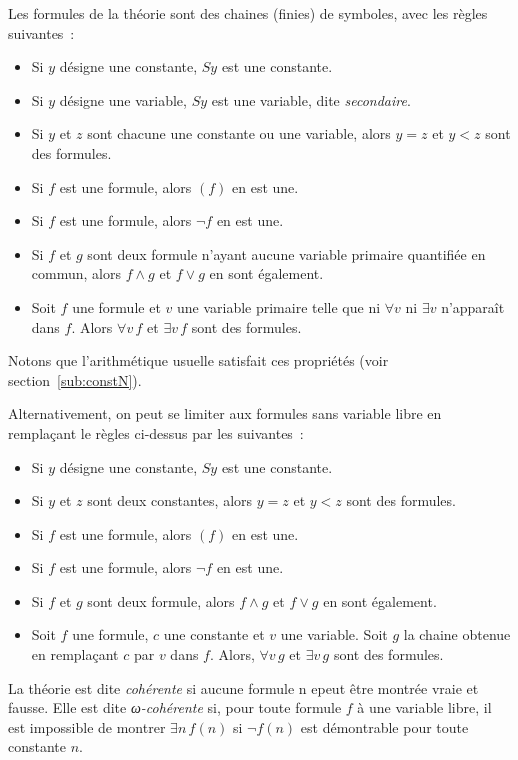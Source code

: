 Les formules de la théorie sont des chaines (finies) de symboles, avec les règles suivantes : 
\begin{itemize}[nosep]
    \item Si $y$ désigne une constante, $S y$ est une constante.
    \item Si $y$ désigne une variable, $S y$ est une variable, dite \emph{secondaire}.
    \item Si $y$ et $z$ sont chacune une constante ou une variable, alors $y = z$ et $y < z$ sont des formules.
    \item Si $f$ est une formule, alors $(f)$ en est une. 
    \item Si $f$ est une formule, alors $\neg f$ en est une. 
    \item Si $f$ et $g$ sont deux formule n'ayant aucune variable primaire quantifiée en commun, alors $f \wedge g$ et $f \vee g$ en sont également. 
    \item Soit $f$ une formule et $v$ une variable primaire telle que ni $\forall v$ ni $\exists v$ n'apparaît dans $f$. 
        Alors $\forall v \, f$ et $\exists v \, f$ sont des formules.
\end{itemize}
Notons que l'arithmétique usuelle satisfait ces propriétés (voir section~\ref{sub:constN}).

Alternativement, on peut se limiter aux formules sans variable libre en remplaçant le règles ci-dessus par les suivantes :
\begin{itemize}[nosep]
    \item Si $y$ désigne une constante, $S y$ est une constante.
    \item Si $y$ et $z$ sont deux constantes, alors $y = z$ et $y < z$ sont des formules.
    \item Si $f$ est une formule, alors $(f)$ en est une. 
    \item Si $f$ est une formule, alors $\neg f$ en est une. 
    \item Si $f$ et $g$ sont deux formule, alors $f \wedge g$ et $f \vee g$ en sont également. 
    \item Soit $f$ une formule, $c$ une constante et $v$ une variable. 
        Soit $g$ la chaine obtenue en remplaçant $c$ par $v$ dans $f$.
        Alors, $\forall v \, g$ et $\exists v \, g$ sont des formules.
\end{itemize}

La théorie est dite \emph{cohérente} si aucune formule n epeut être montrée vraie et fausse. 
Elle est dite \emph{ω-cohérente} si, pour toute formule $f$ à une variable libre, il est impossible de montrer $\exists n \, f(n)$ si $\neg f(n)$ est démontrable pour toute constante $n$.

